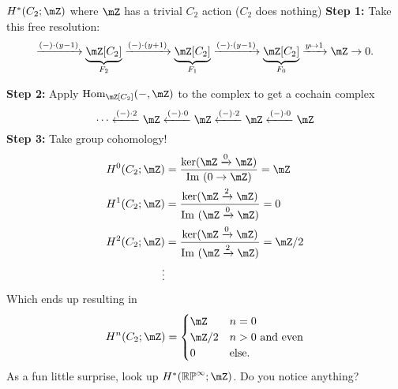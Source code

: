\begin{example}{$H^\ast (C_2;\mZ)$ where $\mZ$ has a trivial $C_2$ action ($C_2$ does nothing)}{}
    \textbf{Step 1:} Take this free resolution: $$\xr{(-)\cdot(y-1)}\underbrace{\mZ[C_2]}_{F_2}\xr{(-)\cdot(y+1)}\underbrace{\mZ[C_2]}_{F_1}\xr{(-)\cdot (y-1)}\underbrace{\mZ[C_2]}_{F_0}\xr{y\mapsto 1}\mZ\to 0.$$

    \medskip 
    \textbf{Step 2:} Apply $\Hom_{\mZ[C_2]}(-,\mZ)$ to the complex to get a cochain complex $$\cdots \xleftarrow{(-)\cdot 2} \mZ\xleftarrow{(-)\cdot 0} \mZ\xleftarrow{(-)\cdot 2} \mZ\xleftarrow{(-)\cdot 0} \mZ$$
    \textbf{Step 3:} Take group cohomology! 
    \begin{align*}
        H^0(C_2;\mZ) & = \frac{\ker(\mZ\xr{0}\mZ)}{\Im(0\to \mZ)} = \mZ\\
        H^1(C_2;\mZ) & = \frac{\ker(\mZ\xr{2}\mZ)}{\Im(\mZ\xr{0} \mZ)} = 0\\
        H^2(C_2;\mZ) & = \frac{\ker(\mZ\xr{0}\mZ)}{\Im(\mZ\xr{2} \mZ)} = \mZ/2\\
        \vdots&
    \end{align*}
    Which ends up resulting in $$H^n(C_2;\mZ) = \begin{cases}
        \mZ & n = 0\\
        \mZ/2 & n>0 \text{ and even}\\
        0 & \text{else}.
    \end{cases}$$
    As a fun little surprise, look up $H^\ast(\mRP^\infty;\mZ)$. Do you notice anything?
\end{example}